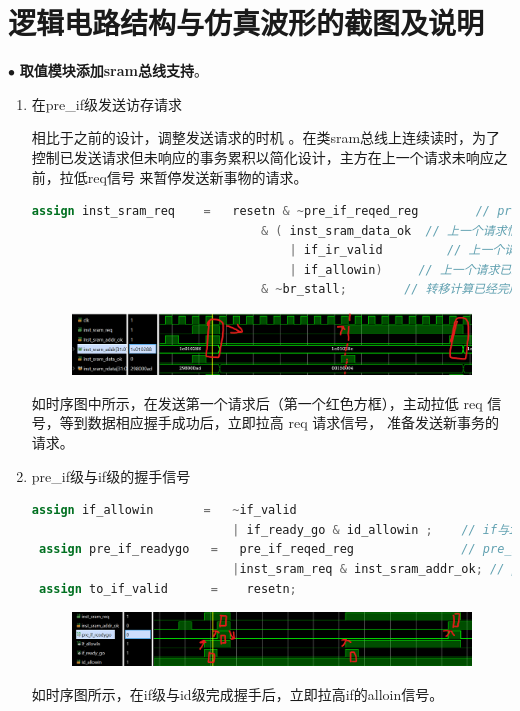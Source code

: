 \documentclass[11pt]{article}
\begin{document}


\section{逻辑电路结构与仿真波形的截图及说明}
\noindent
$\bullet$
\textbf{取值模块添加sram总线支持}。

\begin{enumerate}
  \item 在pre\_if级发送访存请求
  
  相比于之前的设计，调整发送请求的时机 。在类sram总线上连续读时，为了控制已发送请求但未响应的事务累积以简化设计，主方在上一个请求未响应之前，拉低req信号
  来暂停发送新事物的请求。
  \begin{lstlisting}[language=verilog]
    assign inst_sram_req    =   resetn & ~pre_if_reqed_reg        // pre if 没有已经发出请求的指令 
                                & ( inst_sram_data_ok  // 上一个请求恰好返回  
                                    | if_ir_valid         // 上一个请求已经返回，且未进入id级
                                    | if_allowin)     // 上一个请求已经返回，且已经进入id级
                                & ~br_stall;        // 转移计算已经完成
  \end{lstlisting}
\begin{figure}[H]
  \centering
  \includegraphics[width=15cm]{fig/fig1.png}
\end{figure}
如时序图中所示，在发送第一个请求后（第一个红色方框），主动拉低 req 信号，等到数据相应握手成功后，立即拉高 req 请求信号，
准备发送新事务的请求。

\item pre\_if级与if级的握手信号

\begin{lstlisting}[language=verilog]
  assign if_allowin       =   ~if_valid 
                            | if_ready_go & id_allowin ;    // if与id级握手成功 
 assign pre_if_readygo   =   pre_if_reqed_reg               // pre_if级已经与sram握手成功
                            |inst_sram_req & inst_sram_addr_ok; // pre_if级刚好与sram握手成功
 assign to_if_valid      =    resetn;  
\end{lstlisting}
\begin{figure}[H]
  \centering
  \includegraphics[width=15cm]{fig/fig2.png}
\end{figure}
如时序图所示，在if级与id级完成握手后，立即拉高if的alloin信号。


\end{enumerate}
\end{document}
